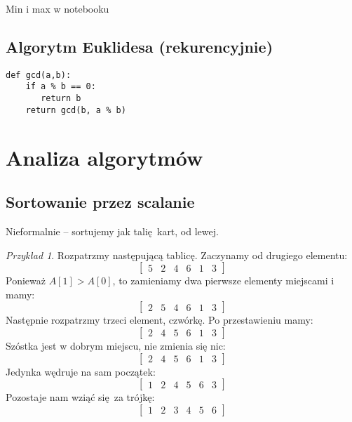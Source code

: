 \documentclass[10pt, oneside]{article}
\theoremstyle{remark}
\newtheorem*{example}{Przykład}
\begin{document}
Min i max w notebooku

\subsection{Algorytm Euklidesa (rekurencyjnie)}

\begin{verbatim}
def gcd(a,b):
    if a % b == 0:
       return b
    return gcd(b, a % b)
\end{verbatim}

\section{Analiza algorytmów}

\subsection{Sortowanie przez scalanie}

Nieformalnie -- sortujemy jak talię kart, od lewej.

\begin{example}
Rozpatrzmy następującą tablicę. Zaczynamy od drugiego elementu:
$$\begin{bmatrix}
	5 & 2 & 4 & 6 & 1 & 3
\end{bmatrix}$$
Ponieważ $A[1] > A[0]$, to zamieniamy dwa pierwsze elementy miejscami i mamy:
$$\begin{bmatrix}
	2 & 5 & 4 & 6 & 1 & 3
\end{bmatrix}$$
Następnie rozpatrzmy trzeci element, czwórkę. Po przestawieniu mamy:
$$\begin{bmatrix}
	2 & 4 & 5 & 6 & 1 & 3
\end{bmatrix}$$
Szóstka jest w dobrym miejscu, nie zmienia się nic:
$$\begin{bmatrix}
	2 & 4 & 5 & 6 & 1 & 3
\end{bmatrix}$$
Jedynka wędruje na sam początek:
$$\begin{bmatrix}
	1 & 2 & 4 & 5 & 6 & 3
\end{bmatrix}$$
Pozostaje nam wziąć się za trójkę:
$$\begin{bmatrix}
	1 & 2 & 3 & 4 & 5 & 6
\end{bmatrix}$$
\end{example}
\end{document}
